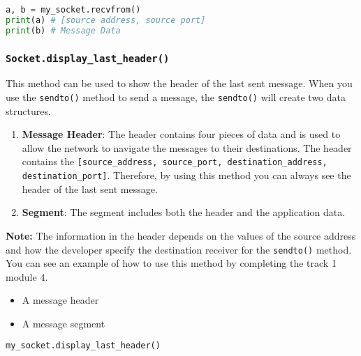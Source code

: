 \documentclass[11pt]{article}
\begin{document}
\begin{lstlisting}[caption={Example for using \texttt{recvfrom()}}, language=Python]
a, b = my_socket.recvfrom()
print(a) # [source address, source port]
print(b) # Message Data
\end{lstlisting}

\subsubsection{\texttt{Socket.\textbf{display\_last\_header()}}}
This method can be used to show the header of the last sent message. When you use the \texttt{sendto()} method to send a message, the \texttt{sendto()} will create two data structures.
\begin{enumerate}
    \item \textbf{Message Header}: The header contains four pieces of data and is used to allow the network to navigate the messages to their destinations. The header contains the \texttt{[source\_address, source\_port, destination\_address, destination\_port]}. Therefore, by using this method you can always see the header of the last sent message.
    \item \textbf{Segment}: The segment includes both the header and the application data.
\end{enumerate}

\textbf{Note:}
The information in the header depends on the values of the source address and how the developer specify the destination receiver for the \texttt{sendto()} method. You can see an example of how to use this method by completing the track 1 module 4.

\begin{itemize}
    \item A message header

    \item A message segment
\end{itemize}

\begin{lstlisting}[caption={Example for using \texttt{display\_last\_header()}}, language=Python]
my_socket.display_last_header()
\end{lstlisting}
\end{document}
